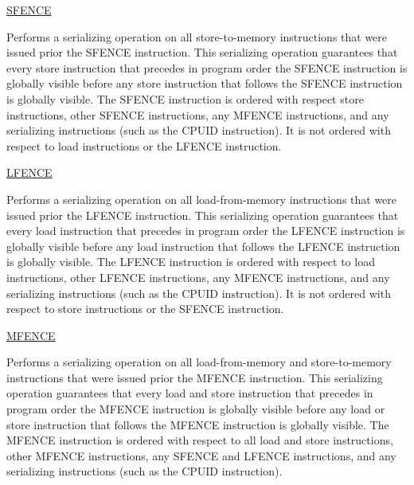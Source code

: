 \begin{itemize}
\begin{item}
\href{http://www.intel.com/Assets/PDF/manual/253667.pdf}{SFENCE} \citep{IntelArch}

Performs a serializing operation on all store-to-memory instructions that were issued prior the SFENCE instruction. This serializing operation guarantees that every store instruction that precedes in program order the SFENCE instruction is globally visible before any store instruction that follows the SFENCE instruction is globally visible. The SFENCE instruction is ordered with respect store instructions, other SFENCE instructions, any MFENCE instructions, and any serializing instructions (such as the CPUID instruction). It is not ordered with respect to load instructions or the LFENCE instruction. 
\end{item}

\begin{item}
\href{http://www.intel.com/Assets/PDF/manual/253666.pdf}{LFENCE}

Performs a serializing operation on all load-from-memory instructions that were issued prior the LFENCE instruction. This serializing operation guarantees that every load instruction that precedes in program order the LFENCE instruction is globally visible before any load instruction that follows the LFENCE instruction is globally visible. The LFENCE instruction is ordered with respect to load instructions, other LFENCE instructions, any MFENCE instructions, and any serializing instructions (such as the CPUID instruction). It is not ordered with respect to store instructions or the SFENCE instruction.
\end{item}
\begin{item}
\href{http://www.intel.com/Assets/PDF/manual/253666.pdf}{MFENCE}

Performs a serializing operation on all load-from-memory and store-to-memory instructions that were issued prior the MFENCE instruction. This serializing operation guarantees that every load and store instruction that precedes in program order the MFENCE instruction is globally visible before any load or store instruction that follows the MFENCE instruction is globally visible. The MFENCE instruction is ordered with respect to all load and store instructions, other MFENCE instructions, any SFENCE and LFENCE instructions, and any serializing instructions (such as the CPUID instruction).
\end{item}
\end{itemize}


